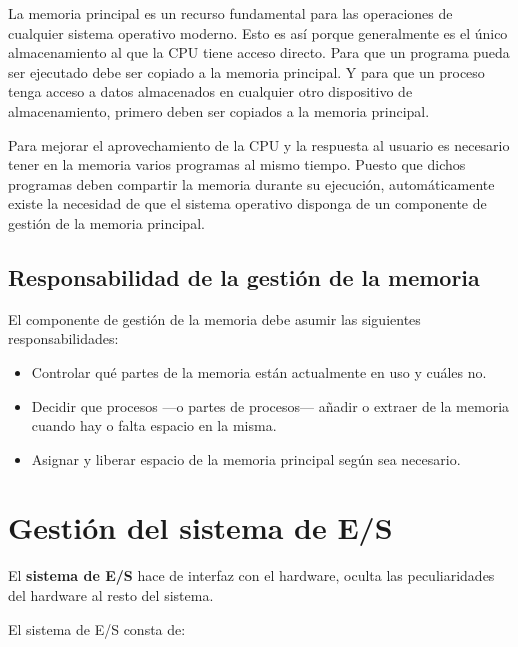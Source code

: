 {} La memoria principal es un recurso fundamental para las operaciones
de cualquier sistema operativo moderno. Esto es así porque generalmente
es el único almacenamiento al que la CPU tiene acceso directo. Para que
un programa pueda ser ejecutado debe ser copiado a la memoria principal.
Y para que un proceso tenga acceso a datos almacenados en cualquier otro
dispositivo de almacenamiento, primero deben ser copiados a la memoria
principal.

Para mejorar el aprovechamiento de la CPU y la respuesta al usuario es
necesario tener en la memoria varios programas al mismo tiempo. Puesto
que dichos programas deben compartir la memoria durante su ejecución,
automáticamente existe la necesidad de que el sistema operativo disponga
de un componente de gestión de la memoria principal.

\subsection{Responsabilidad de la gestión de la
memoria}\label{_responsabilidad_de_la_gestiuxf3n_de_la_memoria}

El componente de gestión de la memoria debe asumir las siguientes
responsabilidades:

\begin{itemize}
\item
  Controlar qué partes de la memoria están actualmente en uso y cuáles
  no.
\item
  Decidir que procesos ---o partes de procesos--- añadir o extraer de la
  memoria cuando hay o falta espacio en la misma.
\item
  Asignar y liberar espacio de la memoria principal según sea necesario.
\end{itemize}

\section{Gestión del sistema de
E/S}\label{_gestiuxf3n_del_sistema_de_es}

{} El \textbf{sistema de E/S}{} hace de interfaz con el hardware, oculta
las peculiaridades del hardware al resto del sistema.

El sistema de E/S consta de:

